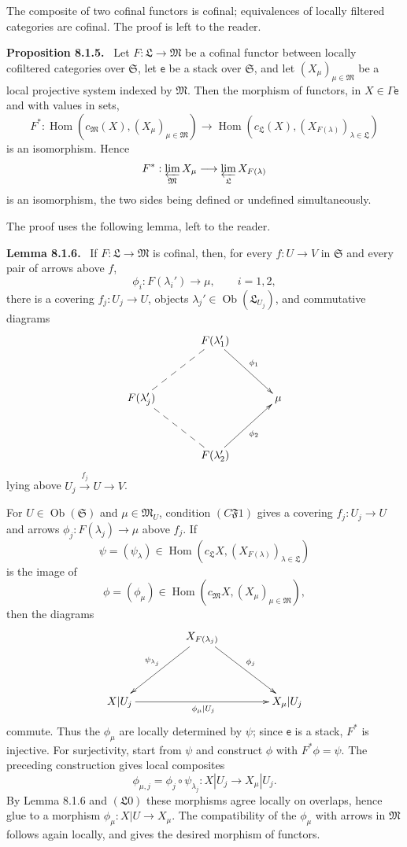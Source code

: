 \documentclass[11pt]{article}
\newcommand{\Hom}{\operatorname{Hom}}
\newcommand{\ob}{\operatorname{Ob}}
\newcommand{\Ss}{\mathfrak{S}}
\newcommand{\Ll}{\mathfrak{L}}
\newcommand{\Mm}{\mathfrak{M}}
\newenvironment{statement}[1]{\par\medskip\noindent\textbf{#1.}\ }{\par\medskip}
\begin{document}
The composite of two cofinal functors is cofinal; equivalences of locally filtered categories are cofinal. The proof is left to the reader.

\begin{statement}{Proposition 8.1.5}
Let $F:\Ll\to\Mm$ be a cofinal functor between locally cofiltered categories over $\Ss$, let $\mathsf e$ be a stack over $\Ss$, and let $(X_\mu)_{\mu\in\Mm}$ be a local projective system indexed by $\Mm$. Then the morphism of functors, in $X\in\Gamma\mathsf e$ and with values in sets,
\[
F^*:\Hom(c_\Mm(X),(X_\mu)_{\mu\in\Mm})
\longrightarrow
\Hom(c_\Ll(X),(X_{F(\lambda)})_{\lambda\in\Ll})
\]
is an isomorphism. Hence
\[
        F^*:\varprojlim_\Mm X_\mu\longrightarrow
        \varprojlim_\Ll X_{F(\lambda)}
\]
is an isomorphism, the two sides being defined or undefined simultaneously.
\end{statement}

The proof uses the following lemma, left to the reader.

\begin{statement}{Lemma 8.1.6}
If $F:\Ll\to\Mm$ is cofinal, then, for every $f:U\to V$ in $\Ss$ and every pair of arrows above $f$,
\[
        \phi_i:F(\lambda_i')\to\mu,
        \qquad i=1,2,
\]
there is a covering $f_j:U_j\to U$, objects $\lambda_j'\in\ob(\Ll_{U_j})$, and commutative diagrams
\[
\xymatrix@=1.25cm{
&F(\lambda_1')\ar[rd]^{\phi_1}&\\
F(\lambda_j')\ar@{--}[ru]\ar@{--}[rd]&&\mu\\
&F(\lambda_2')\ar[ru]_{\phi_2}&
}
\]
lying above $U_j\xrightarrow{f_j}U\to V$.
\end{statement}

For $U\in\ob(\Ss)$ and $\mu\in\Mm_U$, condition $(C\mathfrak F1)$ gives a covering $f_j:U_j\to U$ and arrows $\phi_j:F(\lambda_j)\to\mu$ above $f_j$. If
\[
\psi=(\psi_\lambda)\in\Hom(c_\Ll X,(X_{F(\lambda)})_{\lambda\in\Ll})
\]
is the image of
\[
\phi=(\phi_\mu)\in\Hom(c_\Mm X,(X_\mu)_{\mu\in\Mm}),
\]
then the diagrams
\[
\xymatrix@=1.5cm{
&X_{F(\lambda_j)}\ar[ld]_{\psi_{\lambda_j}}\ar[rd]^{\phi_j}&\\
X|U_j\ar[rr]_{\phi_\mu|U_j}&&X_\mu|U_j
}
\]
commute. Thus the $\phi_\mu$ are locally determined by $\psi$; since $\mathsf e$ is a stack, $F^*$ is injective. For surjectivity, start from $\psi$ and construct $\phi$ with $F^*\phi=\psi$. The preceding construction gives local composites
\[
        \phi_{\mu,j}=\phi_j\circ\psi_{\lambda_j}:X|U_j\to X_\mu|U_j.
\]
By Lemma 8.1.6 and $(\Ll0)$ these morphisms agree locally on overlaps, hence glue to a morphism $\phi_\mu:X|U\to X_\mu$. The compatibility of the $\phi_\mu$ with arrows in $\Mm$ follows again locally, and gives the desired morphism of functors.
\end{document}
